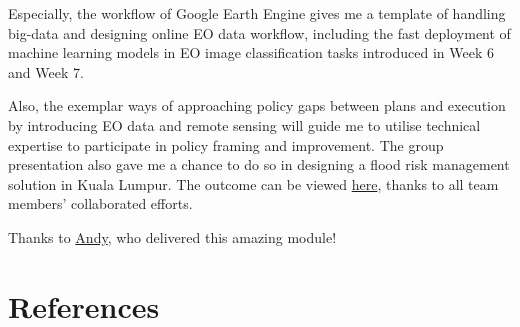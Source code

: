 \documentclass[
  letterpaper,
  DIV=11,
  numbers=noendperiod]{scrreprt}
\begin{document}
Especially, the workflow of Google Earth Engine gives me a template of
handling big-data and designing online EO data workflow, including the
fast deployment of machine learning models in EO image classification
tasks introduced in Week 6 and Week 7.

Also, the exemplar ways of approaching policy gaps between plans and
execution by introducing EO data and remote sensing will guide me to
utilise technical expertise to participate in policy framing and
improvement. The group presentation also gave me a chance to do so in
designing a flood risk management solution in Kuala Lumpur. The outcome
can be viewed \href{https://hansenwgn.github.io/EarthSight/}{here},
thanks to all team members' collaborated efforts.

Thanks to \href{https://github.com/andrewmaclachlan}{Andy}, who
delivered this amazing module!


\hypertarget{references}{%
\chapter*{References}\label{references}}
\end{document}
